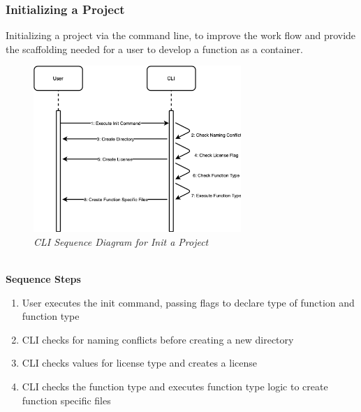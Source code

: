 \subsubsection{Initializing a Project}
Initializing a project via the command line, to improve the work flow and provide the scaffolding needed for a user to develop a function as a container.
\begin{figure}[!ht]
\centering
\includegraphics*[width=0.7\textwidth]{images/init-use-case.png}
\caption{\em CLI Sequence Diagram for Init a Project}
\label{img:cli_seq1}
\end{figure}
\\\textbf{Sequence Steps}
\begin{enumerate}
  \item User executes the init command, passing flags to declare type of function and function type
  \item CLI checks for naming conflicts before creating a new directory
  \item CLI checks values for license type and creates a license
  \item CLI checks the function type and executes function type logic to create function specific files
\end{enumerate}

